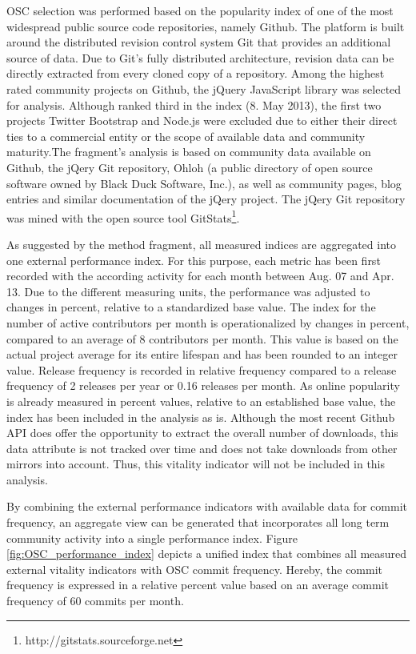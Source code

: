 \documentclass[final,5p,times,twocolumn]{elsarticle}
\begin{document}
OSC selection was performed based on the popularity index of one of the most widespread public source code repositories, namely Github. The platform is built around the distributed revision control system Git that provides an additional source of data. Due to Git's fully distributed architecture, revision data can be directly extracted from every cloned copy of a repository. Among the highest rated community projects on Github, the jQuery JavaScript library was selected for analysis. Although ranked third in the index (8. May 2013), the first two projects Twitter Bootstrap and Node.js were excluded due to either their direct ties to a commercial entity or the scope of available data and community maturity.The fragment's analysis is based on community data available on Github, the jQery Git repository, Ohloh (a public directory of open source software owned by Black Duck Software, Inc.), as well as community pages, blog entries and similar documentation of the jQery project. The jQery Git repository was mined with the open source tool GitStats\footnote{http://gitstats.sourceforge.net}.

As suggested by the method fragment, all measured indices are aggregated into one external performance index. For this purpose, each metric has been first recorded with the according activity for each month between Aug. 07 and Apr. 13. Due to the different measuring units, the performance was adjusted to changes in percent, relative to a standardized base value. The index for the number of active contributors per month is operationalized by changes in percent, compared to an average of 8 contributors per month. This value is based on the actual project average for its entire lifespan and has been rounded to an integer value. Release frequency is recorded in relative frequency compared to a release frequency of 2 releases per year or 0.16 releases per month. As online popularity is already measured in percent values, relative to an established base value, the index has been included in the analysis as is. Although the most recent Github API does offer the opportunity to extract the overall number of downloads, this data attribute is not tracked over time and does not take downloads from other mirrors into account. Thus, this vitality indicator will not be included in this analysis.

By combining the external performance indicators with available data for commit frequency, an aggregate view can be generated that incorporates all long term community activity into a single performance index. Figure \ref{fig:OSC_performance_index} depicts a unified index that combines all measured external vitality indicators with OSC commit frequency. Hereby, the commit frequency is expressed in a relative percent value based on an average commit frequency of 60 commits per month.
\end{document}
